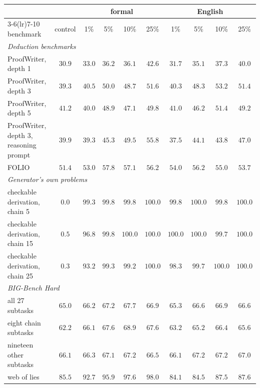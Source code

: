 \begin{tabular}{lccccccccc}
\toprule
 & & \multicolumn{4}{c}{formal} & \multicolumn{4}{c}{English} \\
\cmidrule(lr){3-6}\cmidrule(lr){7-10}
benchmark & control & 1\% & 5\% & 10\% & 25\% & 1\% & 5\% & 10\% & 25\% \\
\midrule
\multicolumn{10}{l}{\textit{Deduction benchmarks}} \\
\quad ProofWriter, depth 1 & $30.9$ & $33.0$ & $36.2$ & $36.1$ & $\mathbf{42.6}$ & $31.7$ & $35.1$ & $37.3$ & $40.0$ \\
\quad ProofWriter, depth 3 & $39.3$ & $40.5$ & $50.0$ & $48.7$ & $51.6$ & $40.3$ & $48.3$ & $\mathbf{53.2}$ & $51.4$ \\
\quad ProofWriter, depth 5 & $41.2$ & $40.0$ & $48.9$ & $47.1$ & $49.8$ & $41.0$ & $46.2$ & $\mathbf{51.4}$ & $49.2$ \\
\quad ProofWriter, depth 3, reasoning prompt & $39.9$ & $39.3$ & $45.3$ & $49.5$ & $\mathbf{55.8}$ & $37.5$ & $44.1$ & $43.8$ & $47.0$ \\
\quad FOLIO & $51.4$ & $53.0$ & $\mathbf{57.8}$ & $57.1$ & $56.2$ & $54.0$ & $56.2$ & $55.0$ & $53.7$ \\
\midrule
\multicolumn{10}{l}{\textit{Generator's own problems}} \\
\quad checkable derivation, chain 5 & $0.0$ & $99.3$ & $99.8$ & $99.8$ & $\mathbf{100.0}$ & $99.8$ & $\mathbf{100.0}$ & $99.8$ & $\mathbf{100.0}$ \\
\quad checkable derivation, chain 15 & $0.5$ & $96.8$ & $99.8$ & $\mathbf{100.0}$ & $\mathbf{100.0}$ & $\mathbf{100.0}$ & $\mathbf{100.0}$ & $99.7$ & $\mathbf{100.0}$ \\
\quad checkable derivation, chain 25 & $0.3$ & $93.2$ & $99.3$ & $99.2$ & $\mathbf{100.0}$ & $98.3$ & $99.7$ & $\mathbf{100.0}$ & $\mathbf{100.0}$ \\
\midrule
\multicolumn{10}{l}{\textit{BIG-Bench Hard}} \\
\quad all 27 subtasks & $65.0$ & $66.2$ & $67.2$ & $\mathbf{67.7}$ & $66.9$ & $65.3$ & $66.6$ & $66.9$ & $66.6$ \\
\quad eight chain subtasks & $62.2$ & $66.1$ & $67.6$ & $\mathbf{68.9}$ & $67.6$ & $63.2$ & $65.2$ & $66.4$ & $65.6$ \\
\quad nineteen other subtasks & $66.1$ & $66.3$ & $67.1$ & $\mathbf{67.2}$ & $66.5$ & $66.1$ & $67.2$ & $67.2$ & $67.0$ \\
\quad web of lies & $85.5$ & $92.7$ & $95.9$ & $97.6$ & $\mathbf{98.0}$ & $84.1$ & $84.5$ & $87.5$ & $87.6$ \\

\end{tabular}
